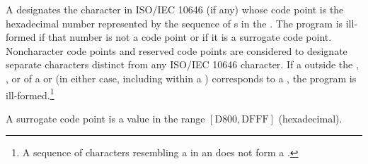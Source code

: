 \documentclass{wg21}
\begin{document}
A 
designates the character in ISO/IEC 10646 (if any)
whose code point is the hexadecimal number represented by
the sequence of s
in the .
The program is ill-formed if that number is not a code point
or if it is a surrogate code point.
Noncharacter code points and reserved code points
are considered to designate separate characters distinct from
any ISO/IEC 10646 character.
If a  outside
the , , or
 of
a  or 
(in either case, including within a )
corresponds to a , the program is ill-formed.\footnote{A sequence of characters resembling a  in an
     does not form a
    .}
\begin{note}
    A surrogate code point is a value in the range $[\mathrm{D800}, \mathrm{DFFF}]$ (hexadecimal).
\end{note}
\end{document}
